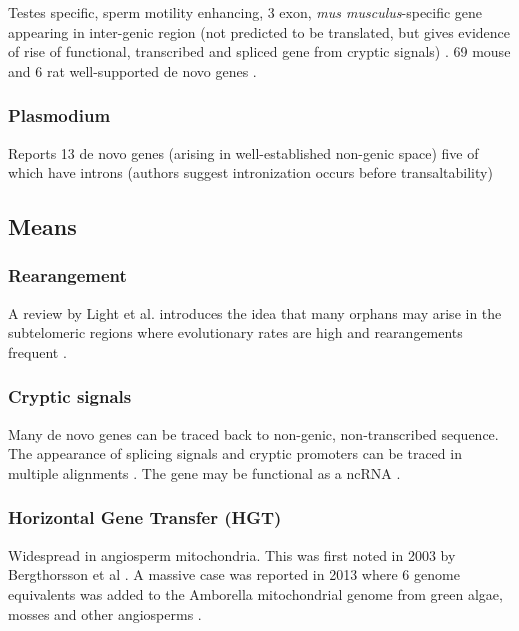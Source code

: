     Testes specific, sperm motility enhancing, 3 exon, \textit{mus
    musculus}-specific gene appearing in inter-genic region (not predicted
    to be translated, but gives evidence of rise of functional, transcribed
    and spliced gene from cryptic signals) \cite{heinen_emergence_2009}. 69
    mouse and 6 rat well-supported de novo genes \cite{murphy_novo_2012}.

\subsubsection{Plasmodium}

    Reports 13 de novo genes (arising in well-established non-genic space)
    five of which have introns (authors suggest intronization occurs before
    transaltability) \cite{yang_novo_2011}

\subsection{Means}

\subsubsection{Rearangement}

A review by Light et al. introduces the idea that many orphans may arise in the
subtelomeric regions where evolutionary rates are high and rearangements
frequent \cite{}.

\subsubsection{Cryptic signals} 

    Many de novo genes can be traced back to non-genic, non-transcribed
    sequence. The appearance of splicing signals and cryptic promoters can
    be traced in multiple alignments \cite{heinen_emergence_2009,
    yang_novo_2011, knowles_recent_2009}. The gene may be functional as a
    ncRNA \cite{heinen_emergence_2009}.

\subsubsection{Horizontal Gene Transfer (HGT)}

    Widespread in angiosperm mitochondria. This was first noted in 2003 by
    Bergthorsson et al \cite{bergthorsson_widespread_2003}. A massive case was
    reported in 2013 where 6 genome equivalents was added to the Amborella
    mitochondrial genome from green algae, mosses and other angiosperms
    \cite{rice_horizontal_2013}.

